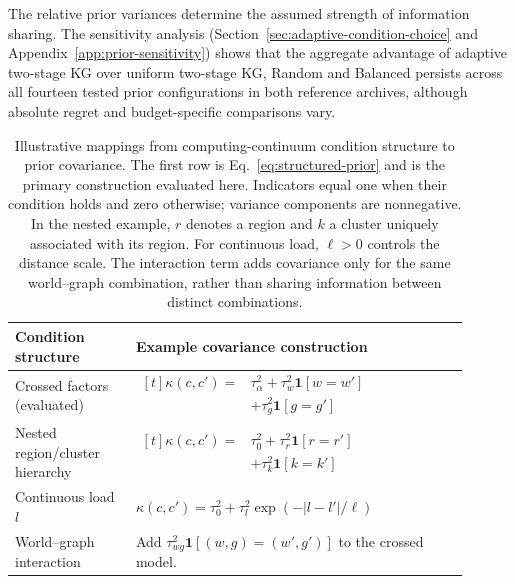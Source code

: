 \documentclass[10pt,a4paper]{article}
\begin{document}
The relative prior variances determine the assumed strength of information sharing. The sensitivity analysis (Section~\ref{sec:adaptive-condition-choice} and Appendix~\ref{app:prior-sensitivity}) shows that the aggregate advantage of adaptive two-stage KG over uniform two-stage KG, Random and Balanced persists across all fourteen tested prior configurations in both reference archives, although absolute regret and budget-specific comparisons vary.

\begin{table}[htbp]
\centering
\small
\setlength{\tabcolsep}{4pt}
\begin{tabular}{p{0.24\linewidth}p{0.66\linewidth}}
\toprule
Condition structure & Example covariance construction \\
\midrule
Crossed factors (evaluated) &
$\displaystyle\begin{aligned}[t]
\kappa(c,c')={}&\tau_\alpha^2+\tau_w^2\mathbf{1}[w=w']\\
&+\tau_g^2\mathbf{1}[g=g']
\end{aligned}$ \\[4pt]
Nested region/cluster hierarchy &
$\displaystyle\begin{aligned}[t]
\kappa(c,c')={}&\tau_0^2+\tau_r^2\mathbf{1}[r=r']\\
&+\tau_k^2\mathbf{1}[k=k']
\end{aligned}$ \\[4pt]
Continuous load $l$ &
$\kappa(c,c')=\tau_0^2+\tau_l^2\exp(-|l-l'|/\ell)$ \\[4pt]
World--graph interaction &
Add $\tau_{wg}^2\mathbf{1}[(w,g)=(w',g')]$ to the crossed model. \\
\bottomrule
\end{tabular}
\caption{Illustrative mappings from computing-continuum condition structure to prior covariance. The first row is Eq.~\eqref{eq:structured-prior} and is the primary construction evaluated here. Indicators equal one when their condition holds and zero otherwise; variance components are nonnegative. In the nested example, $r$ denotes a region and $k$ a cluster uniquely associated with its region. For continuous load, $\ell>0$ controls the distance scale. The interaction term adds covariance only for the same world--graph combination, rather than sharing information between distinct combinations.}
\label{tab:structure-map}
\end{table}
\end{document}
